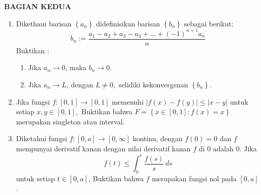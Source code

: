 \documentclass[12pt,twoside]{article}
\begin{document}
\newpage \textbf{BAGIAN KEDUA}
\begin{enumerate}
	\item Dikethaui barisan $\left\lbrace a_n \right\rbrace$ didefinisikan barisan $\left\lbrace b_n \right\rbrace$ sebagai berikut:
	      \begin{equation*}
		      b_n := \dfrac{a_1-a_2+a_3-a_4+\dots+(-1)^{n+1}a_n}{n}
	      \end{equation*}
	      Buktikan :
	      \begin{enumerate}
		      \item Jika $a_n \to 0$, maka $b_n \to 0$.
		      \item Jika $a_n \to L$, dengan $L \neq 0,$ selidiki kekonvergenan $\left\lbrace b_n \right\rbrace$.
	      \end{enumerate}

	\item Jika fungsi $f : [0,1] \to [0,1]$ memenuhi $\left| f(x)-f(y) \right| \leq \left| x-y \right| $ untuk setiap $x,y \in [0,1],$ Buktikan bahwa $F = \left\lbrace x \in [0,1] : f(x)=x \right\rbrace$ merupakan singleton atau interval.

	\item Diketahui fungsi $f : [0,a] \to [0, \infty]$ kontinu, dengan $f(0) = 0$ dan $f$ mempunyai derivatif kanan dengan nilai derivatif kanan $f$ di $0$ adalah $0$. Jika
	      \begin{equation*}
		      f(t) \leq \displaystyle \int_{0}^{t} \dfrac{f(s)}{s}\,ds
	      \end{equation*}
	      untuk setiap $t \in [0,a]$, Buktikan bahwa $f$ merupakan fungsi nol pada $[0,a]$.
\end{enumerate}

\pagebreak
\end{document}
